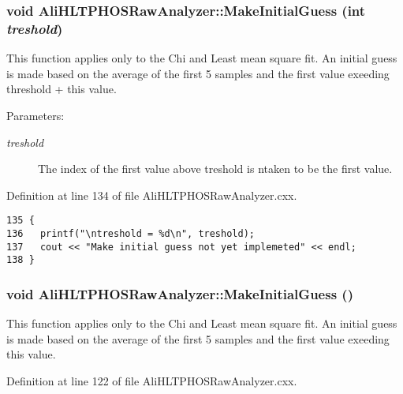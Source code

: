 \subsubsection{\setlength{\rightskip}{0pt plus 5cm}void Ali\-HLTPHOSRaw\-Analyzer::Make\-Initial\-Guess (int {\em treshold})\hspace{0.3cm}{\tt  [inherited]}}\label{classAliHLTPHOSRawAnalyzer_AliHLTPHOSRawAnalyzerPeakFindera15}


This function applies only to the Chi and Least mean square fit. An initial guess is made based on the average of the first 5 samples and the first value exeeding threshold + this value. \begin{Desc}
\item[Parameters:]
\begin{description}
\item[{\em treshold}]The index of the first value above treshold is ntaken to be the first value. \end{description}
\end{Desc}


Definition at line 134 of file Ali\-HLTPHOSRaw\-Analyzer.cxx.

\footnotesize\begin{verbatim}135 {
136   printf("\ntreshold = %d\n", treshold);
137   cout << "Make initial guess not yet implemeted" << endl;  
138 }
\end{verbatim}\normalsize 


\subsubsection{\setlength{\rightskip}{0pt plus 5cm}void Ali\-HLTPHOSRaw\-Analyzer::Make\-Initial\-Guess ()\hspace{0.3cm}{\tt  [inherited]}}\label{classAliHLTPHOSRawAnalyzer_AliHLTPHOSRawAnalyzerPeakFindera14}


This function applies only to the Chi and Least mean square fit. An initial guess is made based on the average of the first 5 samples and the first value exeeding this value. 

Definition at line 122 of file Ali\-HLTPHOSRaw\-Analyzer.cxx.


